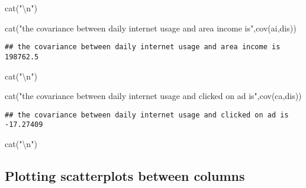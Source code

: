 \documentclass[
]{article}
\newenvironment{Shaded}{\begin{snugshade}}{\end{snugshade}}
\newcommand{\FunctionTok}[1]{\textcolor[rgb]{0.00,0.00,0.00}{#1}}
\newcommand{\NormalTok}[1]{#1}
\newcommand{\SpecialCharTok}[1]{\textcolor[rgb]{0.00,0.00,0.00}{#1}}
\newcommand{\StringTok}[1]{\textcolor[rgb]{0.31,0.60,0.02}{#1}}
\begin{document}
\begin{Shaded}
\begin{Highlighting}[]
\FunctionTok{cat}\NormalTok{(}\StringTok{"}\SpecialCharTok{\textbackslash{}n}\StringTok{"}\NormalTok{)}
\end{Highlighting}
\end{Shaded}

\begin{Shaded}
\begin{Highlighting}[]
\FunctionTok{cat}\NormalTok{(}\StringTok{"the covariance between daily internet usage and area income is"}\NormalTok{,}\FunctionTok{cov}\NormalTok{(ai,dis))}
\end{Highlighting}
\end{Shaded}

\begin{verbatim}
## the covariance between daily internet usage and area income is 198762.5
\end{verbatim}

\begin{Shaded}
\begin{Highlighting}[]
\FunctionTok{cat}\NormalTok{(}\StringTok{"}\SpecialCharTok{\textbackslash{}n}\StringTok{"}\NormalTok{)}
\end{Highlighting}
\end{Shaded}

\begin{Shaded}
\begin{Highlighting}[]
\FunctionTok{cat}\NormalTok{(}\StringTok{"the covariance between daily internet usage and clicked on ad is"}\NormalTok{,}\FunctionTok{cov}\NormalTok{(ca,dis))}
\end{Highlighting}
\end{Shaded}

\begin{verbatim}
## the covariance between daily internet usage and clicked on ad is -17.27409
\end{verbatim}

\begin{Shaded}
\begin{Highlighting}[]
\FunctionTok{cat}\NormalTok{(}\StringTok{"}\SpecialCharTok{\textbackslash{}n}\StringTok{"}\NormalTok{)}
\end{Highlighting}
\end{Shaded}

\hypertarget{plotting-scatterplots-between-columns}{%
\subsection{Plotting scatterplots between
columns}\label{plotting-scatterplots-between-columns}}
\end{document}
